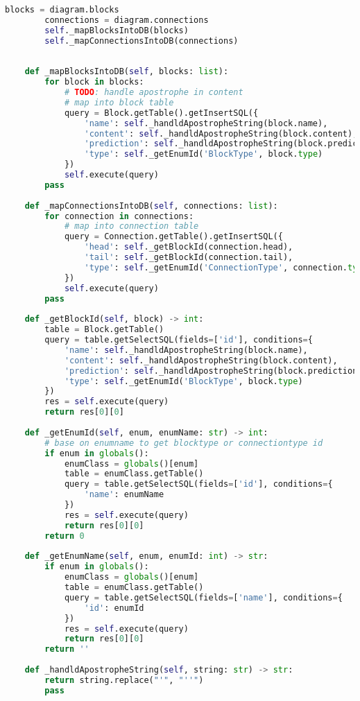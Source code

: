 \begin{lstlisting}[language=Python, caption={$\texttt{DBMS}$ class.}, label={lst:21}]
        blocks = diagram.blocks
        connections = diagram.connections
        self._mapBlocksIntoDB(blocks)
        self._mapConnectionsIntoDB(connections)
        
    
    def _mapBlocksIntoDB(self, blocks: list):
        for block in blocks:
            # TODO: handle apostrophe in content
            # map into block table
            query = Block.getTable().getInsertSQL({
                'name': self._handldApostropheString(block.name),
                'content': self._handldApostropheString(block.content),
                'prediction': self._handldApostropheString(block.prediction),
                'type': self._getEnumId('BlockType', block.type)
            })
            self.execute(query)
        pass
    
    def _mapConnectionsIntoDB(self, connections: list):
        for connection in connections:
            # map into connection table
            query = Connection.getTable().getInsertSQL({
                'head': self._getBlockId(connection.head),
                'tail': self._getBlockId(connection.tail),
                'type': self._getEnumId('ConnectionType', connection.type)
            })
            self.execute(query)
        pass
    
    def _getBlockId(self, block) -> int:
        table = Block.getTable()
        query = table.getSelectSQL(fields=['id'], conditions={
            'name': self._handldApostropheString(block.name),
            'content': self._handldApostropheString(block.content),
            'prediction': self._handldApostropheString(block.prediction),
            'type': self._getEnumId('BlockType', block.type)
        })
        res = self.execute(query)
        return res[0][0]
    
    def _getEnumId(self, enum, enumName: str) -> int:
        # base on enumname to get blocktype or connectiontype id
        if enum in globals():
            enumClass = globals()[enum]
            table = enumClass.getTable()
            query = table.getSelectSQL(fields=['id'], conditions={
                'name': enumName
            })
            res = self.execute(query)
            return res[0][0]
        return 0
    
    def _getEnumName(self, enum, enumId: int) -> str:
        if enum in globals():
            enumClass = globals()[enum]
            table = enumClass.getTable()
            query = table.getSelectSQL(fields=['name'], conditions={
                'id': enumId
            })
            res = self.execute(query)
            return res[0][0]
        return ''
    
    def _handldApostropheString(self, string: str) -> str:
        return string.replace("'", "''")
        pass
    
\end{lstlisting}